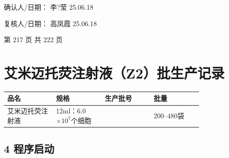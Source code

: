 \documentclass[UTF8,10pt,a4paper,fontset=fandol]{ctexart}
\newcommand{\fieldvalue}[1]{#1}
\newcommand{\handwritten}[1]{#1}
\begin{document}
\vspace{0.8em}

\noindent
确认人/日期：
\fieldvalue{\handwritten{李?莹}}
\quad
\fieldvalue{\handwritten{25.06.18}}

\hfill
复核人/日期：
\fieldvalue{\handwritten{高凤霞}}
\quad
\fieldvalue{\handwritten{25.06.18}}

\vfill

\begin{center}
第 217 页 共 222 页
\end{center}

\newpage

\section*{艾米迈托荧注射液（Z2）批生产记录}

\begin{tabular}{|p{0.20\linewidth}|p{0.20\linewidth}|p{0.20\linewidth}|p{0.20\linewidth}|}
\hline
品名 & 规格 & 生产批号 & 批量 \\ \hline
艾米迈托荧注射液 & 12ml：6.0$\times 10^7$个细胞 &  & 200--480袋 \\ \hline
\end{tabular}

\subsection*{4 程序启动}
\end{document}

